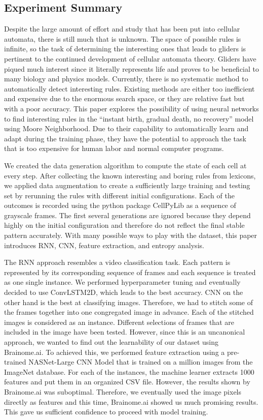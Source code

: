\documentclass[12pt]{article}
\numberwithin{figure}{section} %
\begin{document}
\subsection{Experiment Summary}
Despite the large amount of effort and study that has been put into cellular automata, there is still much that is unknown. The space of possible rules is infinite, so the task of determining the interesting ones that leads to gliders is pertinent to the continued development of cellular automata theory. Gliders have piqued much interest since it literally represents life and proves to be beneficial to many biology and physics models. Currently, there is no systematic method to automatically detect interesting rules. Existing methods are either too inefficient and expensive due to the enormous search space, or they are relative fast but with a poor accuracy. This paper explores the possibility of using neural networks to find interesting rules in the “instant birth, gradual death, no recovery” model using Moore Neighborhood. Due to their capability to automatically learn and adapt during the training phase, they have the potential to approach the task that is too expensive for human labor and normal computer programs. 

We created the data generation algorithm to compute the state of each cell at every step. After collecting the known interesting and boring rules from lexicons, we applied data augmentation to create a sufficiently large training and testing set by rerunning the rules with different initial configurations. Each of the outcomes is recorded using the python package CellPyLib as a sequence of grayscale frames. The first several generations are ignored because they depend highly on the initial configuration and therefore do not reflect the final stable pattern accurately. With many possible ways to play with the dataset, this paper introduces RNN, CNN, feature extraction, and entropy analysis. 

The RNN approach resembles a video classification task. Each pattern is represented by its corresponding sequence of frames and each sequence is treated as one single instance. We performed hyperparameter tuning and eventually decided to use ConvLSTM2D, which leads to the best accuracy. CNN on the other hand is the best at classifying images. Therefore, we had to stitch some of the frames together into one congregated image in advance. Each of the stitched images is considered as an instance. Different selections of frames that are included in the image have been tested. However, since this is an uncanonical approach, we wanted to find out the learnability of our dataset using Brainome.ai. To achieved this, we performed feature extraction using a pre-trained NASNet-Large CNN Model that is trained on a million images from the ImageNet database. For each of the instances, the machine learner extracts 1000 features and put them in an organized CSV file. However, the results shown by Brainome.ai was suboptimal. Therefore, we eventually used the image pixels directly as features and this time, Brainome.ai showed us much promising results. This gave us sufficient confidence to proceed with model training. 
\end{document}
